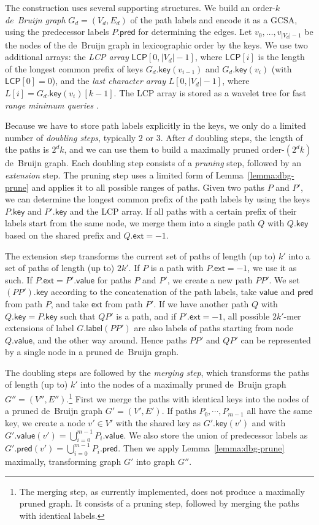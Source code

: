 \documentclass[a4paper,UKenglish]{lipics-v2016}
\newcommand{\abs}[1]{\ensuremath{\lvert #1 \rvert}}
\newcommand{\glabel}{\ensuremath{\mathsf{label}}}
\newcommand{\gpred}{\ensuremath{\mathsf{pred}}}
\newcommand{\gkey}{\ensuremath{\mathsf{key}}}
\newcommand{\gvalue}{\ensuremath{\mathsf{value}}}
\newcommand{\gext}{\ensuremath{\mathsf{ext}}}
\newcommand{\kmer}[1]{$#1$\nobreakdash-mer}
\newcommand{\orderk}[1]{order\nobreakdash-$#1$}
\newcommand{\LCP}{\ensuremath{\mathsf{LCP}}}
\begin{document}
The construction uses several supporting structures. We build an \orderk{k} \emph{de~Bruijn graph} $G_{d} = (V_{d}, E_{d})$ of the path labels and encode it as a GCSA, using the predecessor labels $P.\gpred$ for determining the edges. Let $v_{0}, \dotsc, v_{\abs{V_{d}}-1}$ be the nodes of the de~Bruijn graph in lexicographic order by the keys. We use two additional arrays: the \emph{LCP array} $\LCP[0, \abs{V_{d}}-1]$, where $\LCP[i]$ is the length of the longest common prefix of keys $G_{d}.\gkey(v_{i-1})$ and $G_{d}.\gkey(v_{i})$ (with $\LCP[0] = 0$), and the \emph{last character array} $L[0, \abs{V_{d}}-1]$, where $L[i] = G_{d}.\gkey(v_{i})[k-1]$. The LCP array is stored as a wavelet tree for fast \emph{range minimum queries} \cite{Gagie2012a}.

Because we have to store path labels explicitly in the keys, we only do a limited number of \emph{doubling steps}, typically $2$ or $3$. After $d$ doubling steps, the length of the paths is $2^{d} k$, and we can use them to build a maximally pruned \orderk{(2^{d} k)} de~Bruijn graph. Each doubling step consists of a \emph{pruning} step, followed by an \emph{extension} step. The pruning step uses a limited form of Lemma~\ref{lemma:dbg-prune} and applies it to all possible ranges of paths. Given two paths $P$ and $P'$, we can determine the longest common prefix of the path labels by using the keys $P.\gkey$ and $P'.\gkey$ and the LCP array. If all paths with a certain prefix of their labels start from the same node, we merge them into a single path $Q$ with $Q.\gkey$ based on the shared prefix and $Q.\gext = -1$.

The extension step transforms the current set of paths of length (up to) $k'$ into a set of paths of length (up to) $2k'$. If $P$ is a path with $P.\gext = -1$, we use it as such. If $P.\gext = P'.\gvalue$ for paths $P$ and $P'$, we create a new path $PP'$. We set $(PP').\gkey$ according to the concatenation of the path labels, take $\gvalue$ and $\gpred$ from path $P$, and take $\gext$ from path $P'$. If we have another path $Q$ with $Q.\gkey = P.\gkey$ such that $QP'$ is a path, and if $P'.\gext = -1$, all possible \kmer{2k'} extensions of label $G.\glabel(PP')$ are also labels of paths starting from node $Q.\gvalue$, and the other way around. Hence paths $PP'$ and $QP'$ can be represented by a single node in a pruned de~Bruijn graph.

The doubling steps are followed by the \emph{merging step}, which transforms the paths of length (up to) $k'$ into the nodes of a maximally pruned de~Bruijn graph $G'' = (V'', E'')$.\footnote{The merging step, as currently implemented, does not produce a maximally pruned graph. It consists of a pruning step, followed by merging the paths with identical labels.} First we merge the paths with identical keys into the nodes of a pruned de~Bruijn graph $G' = (V', E')$. If paths $P_{0}, \dotsm, P_{m-1}$ all have the same key, we create a node $v' \in V'$ with the shared key as $G'.\gkey(v')$ and with $G'.\gvalue(v') = \bigcup_{i=0}^{m-1} P_{i}.\gvalue$. We also store the union of predecessor labels as $G'.\gpred(v') = \bigcup_{i=0}^{m-1} P_{i}.\gpred$. Then we apply Lemma~\ref{lemma:dbg-prune} maximally, transforming graph $G'$ into graph $G''$.
\end{document}
